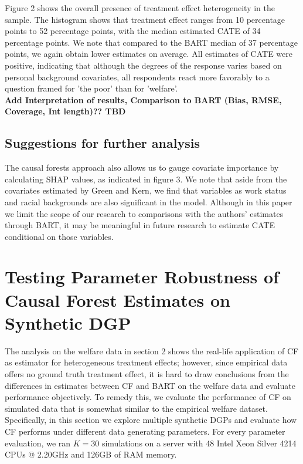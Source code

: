 \documentclass[12pt]{article}
\begin{document}
Figure 2 shows the overall presence of treatment effect heterogeneity in the sample. The histogram shows that treatment effect ranges from 10 percentage points to 52 percentage points, with the median estimated CATE of 34 percentage points. We note that compared to the BART median of 37 percentage points, we again obtain lower estimates on average. All estimates of CATE were positive, indicating that although the degrees of the response varies based on personal background covariates, all respondents react more favorably to a question framed for 'the poor' than for 'welfare'. \\

\textbf{Add Interpretation of results, Comparison to BART (Bias, RMSE, Coverage, Int length)?? TBD} 


\subsection{Suggestions for further analysis}
The causal forests approach also allows us to gauge covariate importance by calculating SHAP values, as indicated in figure 3.  We note that aside from the covariates estimated by Green and Kern, we find that variables as work status and racial backgrounds are also significant in the model. Although in this paper we limit the scope of our research to comparisons with the authors' estimates through BART, it may be meaningful in future research to estimate CATE conditional on those variables. \\


\section{Testing Parameter Robustness of Causal Forest Estimates on Synthetic DGP} 


The analysis on the welfare data in section 2 shows the real-life application of
CF as estimator for heterogeneous treatment effects; however, since empirical
data offers no ground truth treatment effect, it is hard to draw conclusions
from the differences in estimates between CF and BART on the welfare data and
evaluate performance objectively. To remedy this, we evaluate the performance of
CF on simulated data that is somewhat similar to the empirical welfare dataset.
Specifically, in this section we explore multiple synthetic DGPs and evaluate
how CF performs under different data generating parameters. For every parameter
evaluation, we ran $K=30$ simulations on a server with 48 Intel Xeon Silver 4214
CPUs @ 2.20GHz and 126GB of RAM memory.
\end{document}
